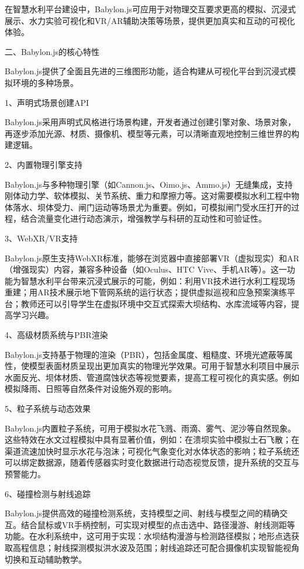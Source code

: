 在智慧水利平台建设中，Babylon.js可应用于对物理交互要求更高的模拟、沉浸式展示、水力实验可视化和VR/AR辅助决策等场景，提供更加真实和互动的可视化体验。

二、Babylon.js的核心特性

Babylon.js提供了全面且先进的三维图形功能，适合构建从可视化平台到沉浸式模拟环境的多种场景。

1、声明式场景创建API

Babylon.js采用声明式风格进行场景构建，开发者通过创建引擎对象、场景对象，再逐步添加光源、材质、摄像机、模型等元素，可以清晰直观地控制三维世界的构建逻辑。

2、内置物理引擎支持

Babylon.js与多种物理引擎（如Cannon.js、Oimo.js、Ammo.js）无缝集成，支持刚体动力学、软体模拟、关节系统、重力和摩擦力等。这对需要模拟水利工程中物体落水、坝体受力、闸门运动等场景尤为重要。例如，可模拟闸门受水压打开的过程，结合流量变化进行动态演示，增强教学与科研的互动性和可验证性。

3、WebXR/VR支持

Babylon.js原生支持WebXR标准，能够在浏览器中直接部署VR（虚拟现实）和AR（增强现实）内容，兼容多种设备（如Oculus、HTC Vive、手机AR等）。这一功能为智慧水利平台带来沉浸式展示的可能，例如：利用VR技术进行水利工程现场重建；用AR技术展示地下管网系统的运行状态；提供虚拟巡视和应急预案演练平台；教师还可以引导学生在虚拟环境中交互式探索大坝结构、水库流域等内容，提高学习兴趣。

4、高级材质系统与PBR渲染

Babylon.js支持基于物理的渲染（PBR），包括金属度、粗糙度、环境光遮蔽等属性，使模型表面材质呈现出更加真实的物理光学效果。可用于智慧水利项目中展示水面反光、坝体材质、管道腐蚀状态等视觉要素，提高工程可视化的真实感。例如模拟降雨、日照等自然条件对设施外观的影响。

5、粒子系统与动态效果

Babylon.js内置粒子系统，可用于模拟水花飞溅、雨滴、雾气、泥沙等自然现象。这些特效在水文过程模拟中具有显著价值，例如：在溃坝实验中模拟土石飞散；在渠道流速加快时显示水花与泡沫；可视化气象变化对水体状态的影响；粒子系统还可以绑定数据源，随着传感器实时变化数据进行动态视觉反馈，提升系统的交互与预警能力。

6、碰撞检测与射线追踪

Babylon.js提供高效的碰撞检测系统，支持模型之间、射线与模型之间的精确交互。结合鼠标或VR手柄控制，可实现对模型的点击选中、路径漫游、射线测距等功能。在水利系统中，这可用于实现：水坝结构漫游与检测路径模拟；地形点选获取高程信息；射线探测模拟洪水波及范围；射线追踪还可配合摄像机实现智能视角切换和互动辅助教学。

